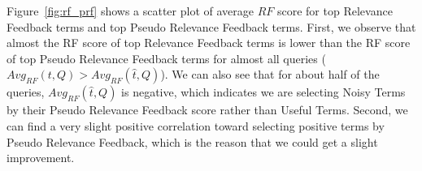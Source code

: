 Figure~\ref{fig:rf_prf} shows a scatter plot of average $\mathit{RF}$ score for top Relevance Feedback terms and top Pseudo Relevance Feedback terms. First, we observe that almost the RF score of top Relevance Feedback terms is lower than the RF score of top Pseudo Relevance Feedback terms for almost all queries ($ Avg_{RF}(t, Q) > Avg_{RF}(\hat{t}, Q)$). We can also see that for about half of the queries, $Avg_{RF}(\hat{t}, Q)$ is negative, which indicates we are selecting Noisy Terms by their Pseudo Relevance Feedback score rather than Useful Terms. Second, we can find a very slight positive correlation toward selecting positive terms by Pseudo Relevance Feedback, which is the reason that we could get a slight improvement.  
